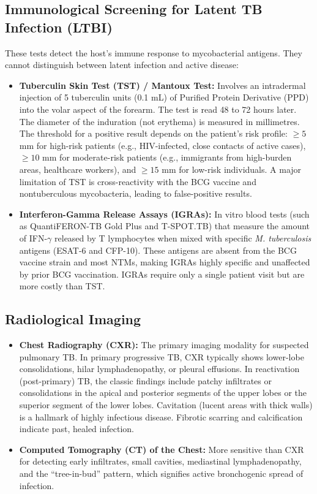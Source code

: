 \subsection*{Immunological Screening for Latent TB Infection (LTBI)}
These tests detect the host's immune response to mycobacterial antigens. They cannot distinguish between latent infection and active disease:
\begin{itemize}
    \item \textbf{Tuberculin Skin Test (TST) / Mantoux Test:} Involves an intradermal injection of 5 tuberculin units (0.1 mL) of Purified Protein Derivative (PPD) into the volar aspect of the forearm. The test is read 48 to 72 hours later. The diameter of the induration (not erythema) is measured in millimetres. The threshold for a positive result depends on the patient's risk profile: $\ge 5$ mm for high-risk patients (e.g., HIV-infected, close contacts of active cases), $\ge 10$ mm for moderate-risk patients (e.g., immigrants from high-burden areas, healthcare workers), and $\ge 15$ mm for low-risk individuals. A major limitation of TST is cross-reactivity with the BCG vaccine and nontuberculous mycobacteria, leading to false-positive results.
    \item \textbf{Interferon-Gamma Release Assays (IGRAs):} In vitro blood tests (such as QuantiFERON-TB Gold Plus and T-SPOT.TB) that measure the amount of IFN-$\gamma$ released by T lymphocytes when mixed with specific \textit{M. tuberculosis} antigens (ESAT-6 and CFP-10). These antigens are absent from the BCG vaccine strain and most NTMs, making IGRAs highly specific and unaffected by prior BCG vaccination. IGRAs require only a single patient visit but are more costly than TST.
\end{itemize}

\subsection*{Radiological Imaging}
\begin{itemize}
    \item \textbf{Chest Radiography (CXR):} The primary imaging modality for suspected pulmonary TB. In primary progressive TB, CXR typically shows lower-lobe consolidations, hilar lymphadenopathy, or pleural effusions. In reactivation (post-primary) TB, the classic findings include patchy infiltrates or consolidations in the apical and posterior segments of the upper lobes or the superior segment of the lower lobes. Cavitation (lucent areas with thick walls) is a hallmark of highly infectious disease. Fibrotic scarring and calcification indicate past, healed infection.
    \item \textbf{Computed Tomography (CT) of the Chest:} More sensitive than CXR for detecting early infiltrates, small cavities, mediastinal lymphadenopathy, and the ``tree-in-bud'' pattern, which signifies active bronchogenic spread of infection.
\end{itemize}

